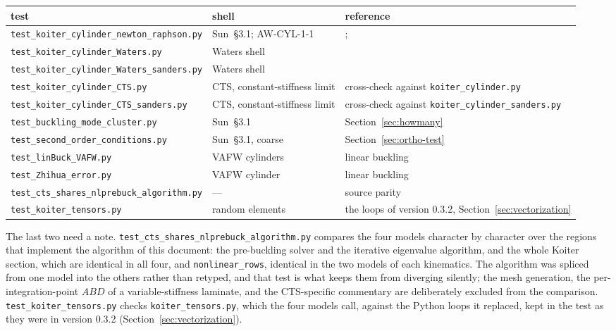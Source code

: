 \documentclass[11pt,a4paper]{article}
\begin{document}
\begin{center}
\begin{tabular}{lll}
\toprule
test & shell & reference \\
\midrule
\texttt{test\_koiter\_cylinder\_newton\_raphson.py}
  & Sun~\S3.1; AW-CYL-1-1
  & \citet{sun2020}; \citet{arbocz2001} \\
\texttt{test\_koiter\_cylinder\_Waters.py}
  & Waters shell
  & \citet{arbocz2002} \\
\texttt{test\_koiter\_cylinder\_Waters\_sanders.py}
  & Waters shell
  & \citet{arbocz2002} \\
\texttt{test\_koiter\_cylinder\_CTS.py}
  & CTS, constant-stiffness limit
  & cross-check against \texttt{koiter\_cylinder.py} \\
\texttt{test\_koiter\_cylinder\_CTS\_sanders.py}
  & CTS, constant-stiffness limit
  & cross-check against \texttt{koiter\_cylinder\_sanders.py} \\
\texttt{test\_buckling\_mode\_cluster.py}
  & Sun~\S3.1
  & Section~\ref{sec:howmany} \\
\texttt{test\_second\_order\_conditions.py}
  & Sun~\S3.1, coarse
  & Section~\ref{sec:ortho-test} \\
\texttt{test\_linBuck\_VAFW.py}
  & VAFW cylinders
  & linear buckling \\
\texttt{test\_Zhihua\_error.py}
  & VAFW cylinder
  & linear buckling \\
\texttt{test\_cts\_shares\_nlprebuck\_algorithm.py}
  & ---
  & source parity \\
\texttt{test\_koiter\_tensors.py}
  & random elements
  & the loops of version 0.3.2, Section~\ref{sec:vectorization} \\
\bottomrule
\end{tabular}
\end{center}

\noindent
The last two need a note.  \texttt{test\_cts\_shares\_nlprebuck\_algorithm.py}
compares the four models character by character over the regions that
implement the algorithm of this document: the pre-buckling solver and the
iterative eigenvalue algorithm, and the whole Koiter section, which are
identical in all four, and \texttt{nonlinear\_rows}, identical in the two
models of each kinematics.  The algorithm was spliced from one model into
the others rather than retyped, and that test is what keeps them from
diverging silently; the mesh generation, the per-integration-point $ABD$ of a
variable-stiffness laminate, and the CTS-specific commentary are deliberately
excluded from the comparison.  \texttt{test\_koiter\_tensors.py} checks
\texttt{koiter\_tensors.py}, which the four models call, against the Python
loops it replaced, kept in the test as they were in version 0.3.2
(Section~\ref{sec:vectorization}).



\end{document}
